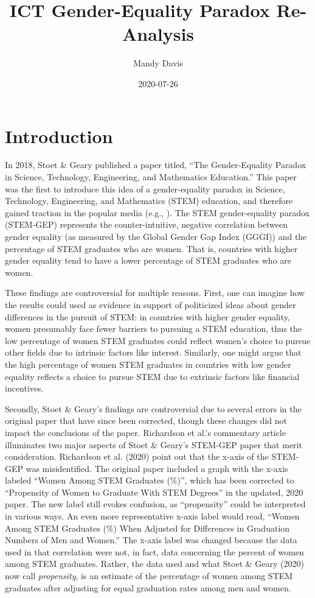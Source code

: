 \documentclass[]{book}
\title{ICT Gender-Equality Paradox Re-Analysis}
\author{Mandy Davis}
\date{2020-07-26}
\begin{document}
\maketitle

{
\setcounter{tocdepth}{1}
\tableofcontents
}
\chapter{Introduction}\label{introduction}

In 2018, Stoet \& Geary published a paper titled, ``The Gender-Equality
Paradox in Science, Technology, Engineering, and Mathematics
Education.'' This paper was the first to introduce this idea of a
gender-equality paradox in Science, Technology, Engineering, and
Mathematics (STEM) education, and therefore gained traction in the
popular media (e.g., \citet{stoetGenderEqualityParadoxScience2018a}).
The STEM gender-equality paradox (STEM-GEP) represents the
counter-intuitive, negative correlation between gender equality (as
measured by the Global Gender Gap Index (GGGI)) and the percentage of
STEM graduates who are women. That is, countries with higher gender
equality tend to have a lower percentage of STEM graduates who are
women.

These findings are controversial for multiple reasons. First, one can
imagine how the results could used as evidence in support of politicized
ideas about gender differences in the pursuit of STEM: in countries with
higher gender equality, women presumably face fewer barriers to pursuing
a STEM education, thus the low percentage of women STEM graduates could
reflect women's choice to pursue other fields due to intrinsic factors
like interest. Similarly, one might argue that the high percentage of
women STEM graduates in countries with low gender equality reflects a
choice to pursue STEM due to extrinsic factors like financial
incentives.

Secondly, Stoet \& Geary's findings are controversial due to several
errors in the original paper that have since been corrected, though
these changes did not impact the conclusions of the paper. Richardson et
al.'s \citeyearpar{richardsonThereGenderEqualityParadox2020a} commentary
article illuminates two major aspects of Stoet \& Geary's
\citeyearpar{stoetGenderEqualityParadoxScience2018a} STEM-GEP paper that
merit consideration. Richardson et al. (2020) point out that the x-axis
of the STEM-GEP was misidentified. The original paper included a graph
with the x-axis labeled ``Women Among STEM Graduates (\%)'', which has
been corrected to ``Propensity of Women to Graduate With STEM Degrees''
in the updated, 2020 paper. The new label still evokes confusion, as
``propensity'' could be interpreted in various ways. An even more
representative x-axis label would read, ``Women Among STEM Graduates
(\%) When Adjusted for Differences in Graduation Numbers of Men and
Women.'' The x-axis label was changed because the data used in that
correlation were not, in fact, data concerning the percent of women
among STEM graduates. Rather, the data used and what Stoet \& Geary
(2020) now call \emph{propensity}, is an estimate of the percentage of
women among STEM graduates after adjusting for equal graduation rates
among men and women.
\end{document}
